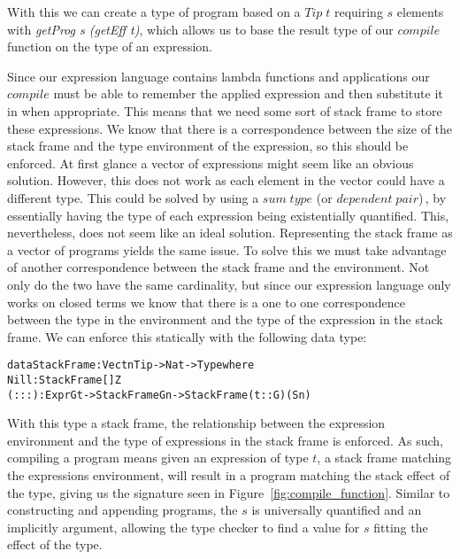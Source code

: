 With this we can create a type of program based on a $Tip\;t$ requiring $s$ elements with \textit{getProg s (getEff t)}, which allows us to base the result type of our $compile$ function on the type of an expression.

Since our expression language contains lambda functions and applications our $compile$ must be able to remember the applied expression and then substitute it in when appropriate. This means that we need some sort of stack frame to store these expressions. We know that there is a correspondence between the size of the stack frame and the type environment of the expression, so this should be enforced. At first glance a vector of expressions might seem like an obvious solution. However, this does not work as each element in the vector could have a different type. This could be solved by using a $sum\;type$ (or $dependent\;pair$)\,\cite[p. 14]{Brady:IdrisTutorial}, by essentially having the type of each expression being existentially quantified. This, nevertheless, does not seem like an ideal solution. Representing the stack frame as a vector of programs yields the same issue.
To solve this we must take advantage of another correspondence between the stack frame and the environment. Not only do the two have the same cardinality, but since our expression language only works on closed terms we know that there is a one to one correspondence between the type in the environment and the type of the expression in the stack frame. We can enforce this statically with the following data type:

\begin{alltt}
data StackFrame : Vect n Tip -> Nat -> Type where
	Nill : StackFrame [] Z
	(:::) : Expr G t -> StackFrame G n -> StackFrame (t :: G) (S n)
\end{alltt}

With this type a stack frame, the relationship between the expression environment and the type of expressions in the stack frame is enforced. As such, compiling a program means given an expression of type $t$, a stack frame matching the expressions environment, will result in a program matching the stack effect of the type, giving us the signature seen in Figure~\ref{fig:compile_function}. Similar to constructing and appending programs, the $s$ is universally quantified and an implicitly argument, allowing the type checker to find a value for $s$ fitting the effect of the type.

